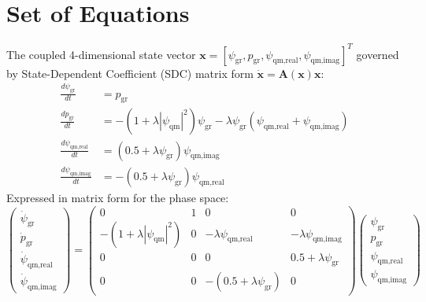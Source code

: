 \section{Set of Equations}
The coupled 4-dimensional state vector $\mathbf{x} = [\psi_{\text{gr}}, p_{\text{gr}}, \psi_{\text{qm,real}}, \psi_{\text{qm,imag}}]^T$ governed by State-Dependent Coefficient (SDC) matrix form $\dot{\mathbf{x}} = \mathbf{A}(\mathbf{x})\mathbf{x}$:
\begin{align}
\frac{d\psi_{\text{gr}}}{dt} &= p_{\text{gr}} \\
\frac{dp_{\text{gr}}}{dt} &= -\left( 1 + \lambda |\psi_{\text{qm}}|^2 \right) \psi_{\text{gr}} - \lambda \psi_{\text{gr}} \left( \psi_{\text{qm,real}} + \psi_{\text{qm,imag}} \right) \\
\frac{d\psi_{\text{qm,real}}}{dt} &= \left( 0.5 + \lambda \psi_{\text{gr}} \right) \psi_{\text{qm,imag}} \\
\frac{d\psi_{\text{qm,imag}}}{dt} &= -\left( 0.5 + \lambda \psi_{\text{gr}} \right) \psi_{\text{qm,real}}
\end{align}
Expressed in matrix form for the phase space:
\begin{equation}
\begin{pmatrix} \dot{\psi}_{\text{gr}} \\ \dot{p}_{\text{gr}} \\ \dot{\psi}_{\text{qm,real}} \\ \dot{\psi}_{\text{qm,imag}} \end{pmatrix} = \begin{pmatrix} 
0 & 1 & 0 & 0 \\ 
-\left(1 + \lambda |\psi_{\text{qm}}|^2\right) & 0 & -\lambda \psi_{\text{qm,real}} & -\lambda \psi_{\text{qm,imag}} \\ 
0 & 0 & 0 & 0.5 + \lambda \psi_{\text{gr}} \\ 
0 & 0 & -(0.5 + \lambda \psi_{\text{gr}}) & 0 
\end{pmatrix} \begin{pmatrix} \psi_{\text{gr}} \\ p_{\text{gr}} \\ \psi_{\text{qm,real}} \\ \psi_{\text{qm,imag}} \end{pmatrix}
\end{equation}

